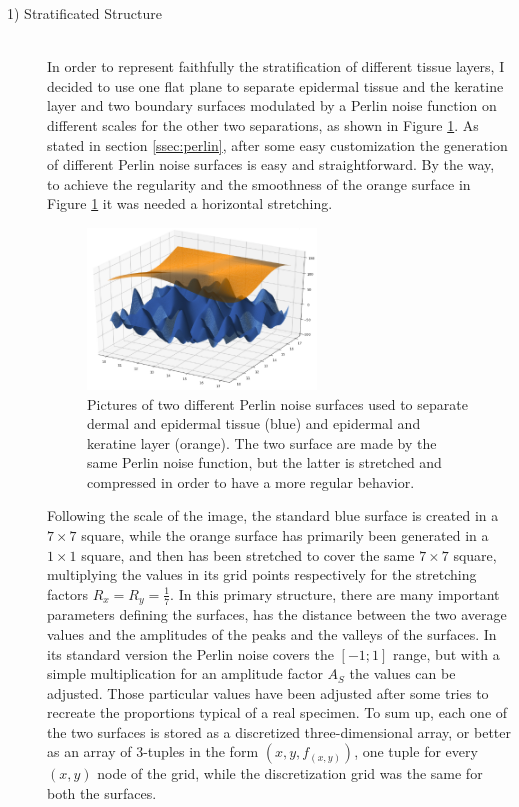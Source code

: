 \begin{description}
    \item [1) Stratificated Structure] \hfill \\
    In order to represent faithfully the stratification of different tissue layers, I decided to use one flat plane to separate epidermal tissue and the keratine layer and two boundary surfaces modulated by a Perlin noise function on different scales for the other two separations, as shown in Figure \ref{fig:2_surf_plot}. As stated in section \ref{ssec:perlin}, after some easy customization the generation of different Perlin noise surfaces is easy and straightforward. By the way, to achieve the regularity and the smoothness of the orange surface in Figure \ref{fig:2_surf_plot} it was needed a horizontal stretching.

    \begin{figure}
        \centering
        \includegraphics[width = 0.6\textwidth]{images/2_surf_plot}
        \caption{Pictures of two different Perlin noise surfaces used to separate dermal and epidermal tissue (blue) and epidermal and keratine layer (orange). The two surface are made by the same Perlin noise function, but the latter is stretched and compressed in order to have a more regular behavior.}
        \label{fig:2_surf_plot}
    \end{figure}

    Following the scale of the image, the standard blue surface is created in a $7 \times 7$ square, while the orange surface has primarily been generated in a $1 \times 1$ square, and then has been stretched to cover the same $7 \times 7$ square, multiplying the values in its grid points respectively for the stretching factors $R_x=R_y=\frac{1}{7}$. In this primary structure, there are many important parameters defining the surfaces, has the distance between the two average values and the amplitudes of the peaks and the valleys of the surfaces. In its standard version the Perlin noise covers the $[-1;1]$ range, but with a simple multiplication for an amplitude factor $A_S$ the values can be adjusted. Those particular values have been adjusted after some tries to recreate the proportions typical of a real specimen. To sum up, each one of the two surfaces is stored as a discretized three-dimensional array, or better as an array of 3-tuples in the form $(x,y,f_{(x,y)})$, one tuple for every $(x,y)$ node of the grid, while the discretization grid was the same for both the surfaces.


\end{description}
